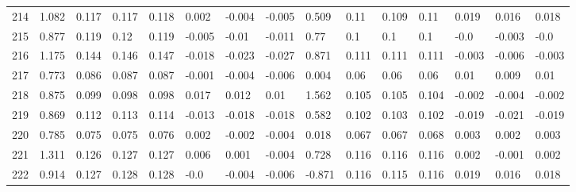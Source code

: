 \begin{table}
\begin{tabular}{|l|l|lll|lll|l|lll|lll}
		214 & 1.082 & 0.117 & 0.117 & 0.118 & 0.002 & -0.004 & -0.005 & 0.509 & 0.11 & 0.109 & 0.11 & 0.019 & 0.016 & 0.018 \\
		215 & 0.877 & 0.119 & 0.12 & 0.119 & -0.005 & -0.01 & -0.011 & 0.77 & 0.1 & 0.1 & 0.1 & -0.0 & -0.003 & -0.0 \\
		216 & 1.175 & 0.144 & 0.146 & 0.147 & -0.018 & -0.023 & -0.027 & 0.871 & 0.111 & 0.111 & 0.111 & -0.003 & -0.006 & -0.003 \\
		217 & 0.773 & 0.086 & 0.087 & 0.087 & -0.001 & -0.004 & -0.006 & 0.004 & 0.06 & 0.06 & 0.06 & 0.01 & 0.009 & 0.01 \\
		218 & 0.875 & 0.099 & 0.098 & 0.098 & 0.017 & 0.012 & 0.01 & 1.562 & 0.105 & 0.105 & 0.104 & -0.002 & -0.004 & -0.002 \\
		219 & 0.869 & 0.112 & 0.113 & 0.114 & -0.013 & -0.018 & -0.018 & 0.582 & 0.102 & 0.103 & 0.102 & -0.019 & -0.021 & -0.019 \\
		220 & 0.785 & 0.075 & 0.075 & 0.076 & 0.002 & -0.002 & -0.004 & 0.018 & 0.067 & 0.067 & 0.068 & 0.003 & 0.002 & 0.003 \\
		221 & 1.311 & 0.126 & 0.127 & 0.127 & 0.006 & 0.001 & -0.004 & 0.728 & 0.116 & 0.116 & 0.116 & 0.002 & -0.001 & 0.002 \\
		222 & 0.914 & 0.127 & 0.128 & 0.128 & -0.0 & -0.004 & -0.006 & -0.871 & 0.116 & 0.115 & 0.116 & 0.019 & 0.016 & 0.018 
	\end{tabular}
	
\end{table}
